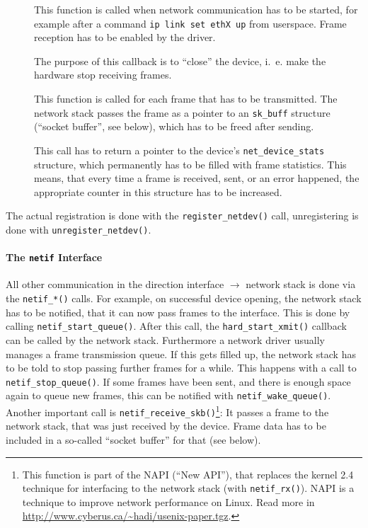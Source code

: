 \documentclass[a4paper,12pt,BCOR6mm,bibtotoc,idxtotoc]{scrbook}
\begin{document}
\begin{description}

\item[\usebox\boxopen] This function is called when network communication has
to be started, for example after a command \lstinline+ip link set ethX up+
from userspace. Frame reception has to be enabled by the driver.

\item[\usebox\boxstop] The purpose of this callback is to ``close'' the
device, i.~e. make the hardware stop receiving frames.

\item[\usebox\boxxmit] This function is called for each frame that has to be
transmitted. The network stack passes the frame as a pointer to an
\lstinline+sk_buff+ structure (``socket buffer'', see
below), which has to be freed after sending.

\item[\usebox\boxstats] This call has to return a pointer to the device's
\lstinline+net_device_stats+ structure, which permanently has to be filled with
frame statistics. This means, that every time a frame is received, sent, or an
error happened, the appropriate counter in this structure has to be increased.

\end{description}

The actual registration is done with the \lstinline+register_netdev()+ call,
unregistering is done with \lstinline+unregister_netdev()+.

\paragraph{The \lstinline+netif+ Interface}

All other communication in the direction interface $\to$ network stack is done
via the \lstinline+netif_*()+ calls. For example, on successful device opening,
the network stack has to be notified, that it can now pass frames to the
interface. This is done by calling \lstinline+netif_start_queue()+. After this
call, the \lstinline+hard_start_xmit()+ callback can be called by the network
stack. Furthermore a network driver usually manages a frame transmission queue.
If this gets filled up, the network stack has to be told to stop passing
further frames for a while. This happens with a call to
\lstinline+netif_stop_queue()+. If some frames have been sent, and there is
enough space again to queue new frames, this can be notified with
\lstinline+netif_wake_queue()+. Another important call is
\lstinline+netif_receive_skb()+\footnote{This function is part of the NAPI
(``New API''), that replaces the kernel 2.4 technique for interfacing to the
network stack (with \lstinline+netif_rx()+). NAPI is a technique to improve
network performance on Linux. Read more in
\url{http://www.cyberus.ca/~hadi/usenix-paper.tgz}.}: It passes a frame to the
network stack, that was just received by the device. Frame data has to be
included in a so-called ``socket buffer'' for that (see below).
\end{document}
